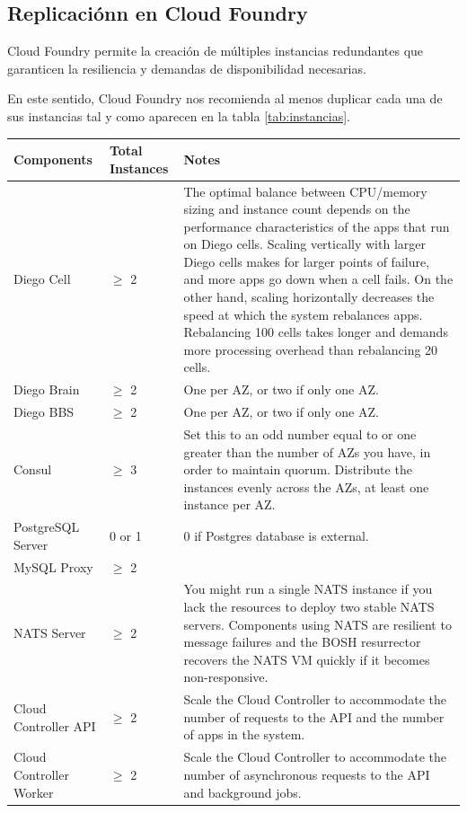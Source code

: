 \documentclass[a4paper,11pt]{article}
\begin{document}
\subsection{Replicaciónn en Cloud Foundry}
Cloud Foundry permite la creación de múltiples instancias redundantes que garanticen la resiliencia y demandas de disponibilidad necesarias.

En este sentido, Cloud Foundry nos recomienda al menos duplicar cada una de sus instancias tal y como aparecen en la tabla \ref{tab:instancias}.


\begin{table}[htp]
\centering
\begin{tabular}{ | p{3cm} | p{3cm} | p{10cm} |}
\hline
Components & Total Instances & Notes \\ \hline
Diego Cell & $\geq$ 2 & The optimal balance between CPU/memory sizing and instance count depends on the performance characteristics of the apps that run on Diego cells. Scaling vertically with larger Diego cells makes for larger points of failure, and more apps go down when a cell fails. On the other hand, scaling horizontally decreases the speed at which the system rebalances apps. Rebalancing 100 cells takes longer and demands more processing overhead than rebalancing 20 cells. \\\hline
Diego Brain & $\geq$ 2 & One per AZ, or two if only one AZ. \\\hline
Diego BBS & $\geq$ 2 & One per AZ, or two if only one AZ. \\\hline
Consul & $\geq$ 3 & Set this to an odd number equal to or one greater than the number of AZs you have, in order to maintain quorum. Distribute the instances evenly across the AZs, at least one instance per AZ. \\\hline
PostgreSQL Server & 0 or 1 & 0 if Postgres database is external. \\\hline
MySQL Proxy & $\geq$ 2 &  \\\hline
NATS Server & $\geq$ 2 & You might run a single NATS instance if you lack the resources to deploy two stable NATS servers. Components using NATS are resilient to message failures and the BOSH resurrector recovers the NATS VM quickly if it becomes non-responsive. \\\hline
Cloud Controller API & $\geq$ 2 & Scale the Cloud Controller to accommodate the number of requests to the API and the number of apps in the system. \\\hline
Cloud Controller Worker & $\geq$ 2 & Scale the Cloud Controller to accommodate the number of asynchronous requests to the API and background jobs. \\\hline

\end{tabular}
\end{table}
\end{document}
